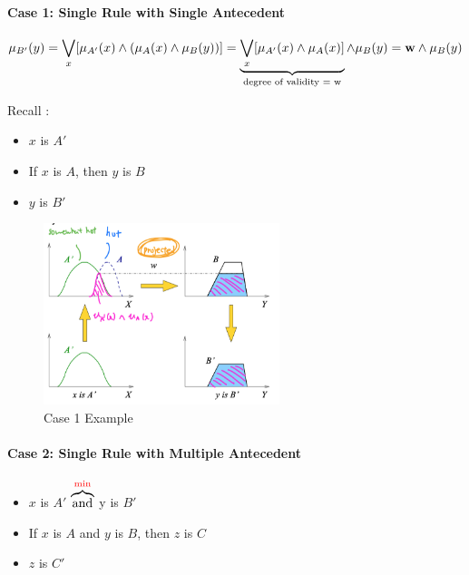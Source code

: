 \documentclass{tron}
\begin{document}
\paragraph{Case 1: Single Rule with Single Antecedent}
\begin{equation}
	\mu_{B'}(y) =\underset{x}{\bigvee} [\mu_{A'} (x) \land ( \mu_A (x) \land  \mu_B (y))] = \underbrace{\underset{x}{\bigvee} [\mu_{A'} (x) \land \mu_A (x)] }_{\text{degree of validity = w}}\land \mu_B(y) = \mathbf{w} \land \mu_B(y)
\end{equation}

Recall :
\begin{itemize}
	\item {} $x$ is $A'$ 
	\item {} If $x$ is $A$, then $y$ is $B$
	\item {} $y$ is $B'$
\end{itemize}

\begin{figure}[H]
	\centering
	\includegraphics[height=200px]{Figs/FuzzyInferencing/case1}
	\caption{Case 1 Example}
	\label{fig:fuzzy-inf:case1:ex}
\end{figure}


\paragraph{Case 2: Single Rule with Multiple Antecedent}
\begin{itemize}
	\item {} $x$ is $A'$ $\overbrace{\text{and}}^{\textcolor{red}{\min}}$ y is $B'$
	\item {} If $x$ is $A$ and $y$ is $B$, then $z$ is $C$
	\item {} $z$ is $C'$
\end{itemize}
\end{document}
